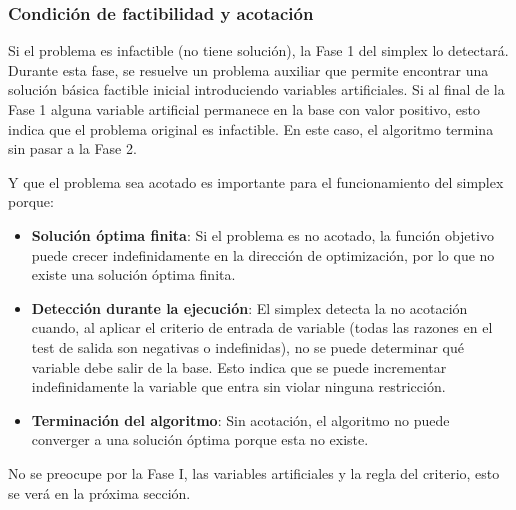 \subsubsection{Condición de factibilidad y acotación}

Si el problema es infactible (no tiene solución), la Fase 1 del simplex lo detectará. Durante esta fase, se resuelve un problema auxiliar que permite encontrar una solución básica factible inicial introduciendo variables artificiales. Si al final de la Fase 1 alguna variable artificial permanece en la base con valor positivo, esto indica que el problema original es infactible. En este caso, el algoritmo termina sin pasar a la Fase 2.

Y que el problema sea acotado es importante para el funcionamiento del simplex porque:
\begin{itemize}
  \item \textbf{Solución óptima finita}: Si el problema es no acotado, la función objetivo puede crecer indefinidamente en la dirección de optimización, por lo que no existe una solución óptima finita.
  \item \textbf{Detección durante la ejecución}: El simplex detecta la no acotación cuando, al aplicar el criterio de entrada de variable (todas las razones en el test de salida son negativas o indefinidas), no se puede determinar qué variable debe salir de la base. Esto indica que se puede incrementar indefinidamente la variable que entra sin violar ninguna restricción.
  \item \textbf{Terminación del algoritmo}: Sin acotación, el algoritmo no puede converger a una solución óptima porque esta no existe.
\end{itemize}

\begin{tcolorbox}[myconclusion]
  No se preocupe por la Fase I, las variables artificiales y la regla del criterio, esto se verá en la próxima sección.
\end{tcolorbox}